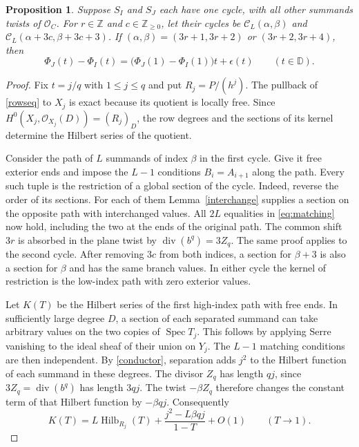 \documentclass[11pt,a4paper,reqno]{amsart}
\numberwithin{equation}{section}
\theoremstyle{plain}
\newtheorem{proposition}[theorem]{Proposition}
\newcommand{\OO}{\mathcal O}
\newcommand{\Ccal}{\mathcal C}
\DeclareMathOperator{\Hilb}{Hilb}
\begin{document}
\begin{proposition}\label{compare}
Suppose $S_I$ and $S_J$ each have one cycle, with all other summands twists of $\OO_C$. For $r\in\mathbb Z$ and $c\in\mathbb Z_{\ge0}$, let their cycles be $\Ccal_L(\alpha,\beta)$ and $\Ccal_L(\alpha+3c,\beta+3c+3)$. If $(\alpha,\beta)=(3r+1,3r+2)$ or $(3r+2,3r+4)$, then
\[
 \Phi_J(t)-\Phi_I(t)=\bigl(\Phi_J(1)-\Phi_I(1)\bigr)t+\epsilon(t)
 \qquad(t\in\mathbb D).
\]
\end{proposition}
\begin{proof}
Fix $t=j/q$ with $1\le j\le q$ and put $R_j=P/(h^j)$. The pullback of \eqref{rowseq} to $X_j$ is exact because its quotient is locally free. Since $H^0(X_j,\OO_{X_j}(D))=(R_j)_D$, the row degrees and the sections of its kernel determine the Hilbert series of the quotient.

Consider the path of $L$ summands of index $\beta$ in the first cycle. Give it free exterior ends and impose the $L-1$ conditions $B_i=A_{i+1}$ along the path. Every such tuple is the restriction of a global section of the cycle. Indeed, reverse the order of its sections. For each of them Lemma~\ref{interchange} supplies a section on the opposite path with interchanged values. All $2L$ equalities in \eqref{eq:matching} now hold, including the two at the ends of the original path. The common shift $3r$ is absorbed in the plane twist by $\operatorname{div}(b^q)=3Z_q$. The same proof applies to the second cycle. After removing $3c$ from both indices, a section for $\beta+3$ is also a section for $\beta$ and has the same branch values. In either cycle the kernel of restriction is the low-index path with zero exterior values.

Let $K(T)$ be the Hilbert series of the first high-index path with free ends. In sufficiently large degree $D$, a section of each separated summand can take arbitrary values on the two copies of $\operatorname{Spec}T_j$. This follows by applying Serre vanishing to the ideal sheaf of their union on $Y_j$. The $L-1$ matching conditions are then independent. By \eqref{conductor}, separation adds $j^2$ to the Hilbert function of each summand in these degrees. The divisor $Z_q$ has length $qj$, since $3Z_q=\operatorname{div}(b^q)$ has length $3qj$. The twist $-\beta Z_q$ therefore changes the constant term of that Hilbert function by $-\beta qj$. Consequently
\[
 K(T)=L\Hilb_{R_j}(T)+\frac{j^2-L\beta qj}{1-T}+O(1)
 \qquad (T\to1).
\]


\end{proof}
\end{document}
